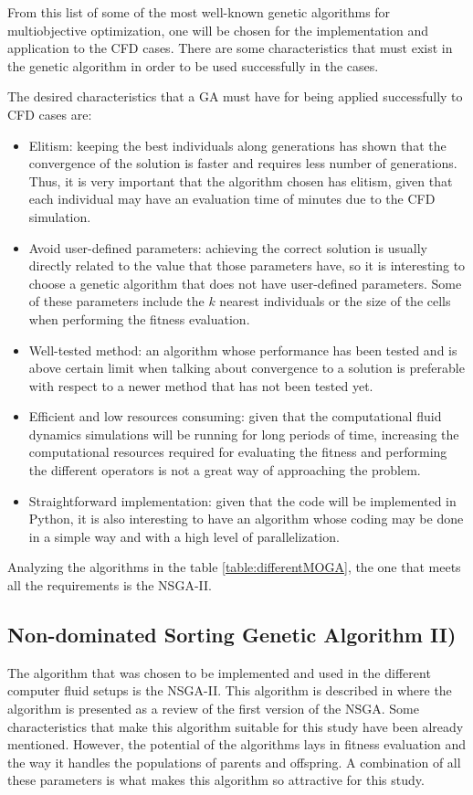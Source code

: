 From this list of some of the most well-known genetic algorithms for multiobjective optimization, one will be chosen for the implementation and application to the CFD cases. There are some characteristics that must exist in the genetic algorithm in order to be used successfully in the cases.

\newpage

The desired characteristics that a GA  must have for being applied successfully to CFD cases are:
\begin{itemize}
    \item Elitism: keeping the best individuals along generations has shown that the convergence of the solution is faster and requires less number of generations. Thus, it is very important that the algorithm chosen has elitism, given that each individual may have an evaluation time of minutes due to the CFD simulation. 
    \item Avoid user-defined parameters: achieving the correct solution is usually directly related to the value that those parameters have, so it is interesting to choose a genetic algorithm that does not have user-defined parameters. Some of these parameters include the $k$ nearest individuals or the size of the cells when performing the fitness evaluation. 
    \item Well-tested method: an algorithm whose performance has been tested and is above certain limit when talking about convergence to a solution is preferable with respect to a newer method that has not been tested yet. 
    \item Efficient and low resources consuming: given that the computational fluid dynamics simulations will be running for long periods of time, increasing the computational resources required for evaluating the fitness and performing the different operators is not a great way of approaching the problem.
    \item Straightforward implementation: given that the code will be implemented in Python, it is also interesting to have an algorithm whose coding may be done in a simple way and with a high level of parallelization.
\end{itemize}
Analyzing the algorithms in the table \ref{table:differentMOGA}, the one that meets all the requirements is the NSGA-II. 

\subsection{Non-dominated Sorting Genetic Algorithm II)}
The algorithm that was chosen to be implemented and used in the different computer fluid setups is the NSGA-II. This algorithm is described in \cite{deb2002fast} where the algorithm is presented as a review of the first version of the NSGA. Some characteristics that make this algorithm suitable for this study have been already mentioned. However, the potential of the algorithms lays in fitness evaluation and the way it handles the populations of parents and offspring. A combination of all these parameters is what makes this algorithm so attractive for this study. 

